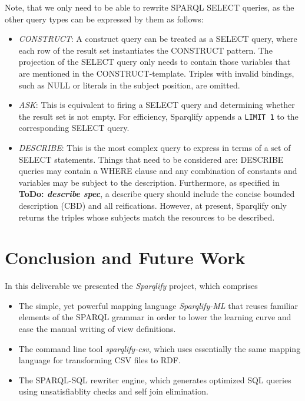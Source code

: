 \documentclass[a4paper,twoside,bibtotoc,abstracton,12pt,BCOR=15mm]{scrreprt}
\newcommand{\todo}[1]{\textbf{ToDo: \textit{#1}}}
\begin{document}
Note, that we only need to be able to rewrite SPARQL SELECT queries, as the other query types can be expressed by  them as follows:

\begin{itemize}
\item \emph{CONSTRUCT}: A construct query can be treated as a SELECT query, where each row of the result set instantiates the CONSTRUCT pattern.
	The projection of the SELECT query only needs to contain those variables that are mentioned in the CONSTRUCT-template.
	Triples with invalid bindings, such as NULL or literals in the subject position, are omitted.
\item \emph{ASK}: This is equivalent to firing a SELECT query and determining whether the result set is not empty. 
	For efficiency, Sparqlify appends a \texttt{LIMIT 1} to the corresponding SELECT query. 
\item \emph{DESCRIBE}: This is the most complex query to express in terms of a set of SELECT statements. 
	Things that need to be considered are: DESCRIBE queries may contain a WHERE clause and any combination of constants and variables may be subject to the description.
	Furthermore, as specified in \todo{describe spec}, a describe query should include the concise bounded description (CBD) and all reifications.
	However, at present, Sparqlify only returns the triples whose subjects match the resources to be described.    
\end{itemize}


\section{Conclusion and Future Work}
In this deliverable we presented the \emph{Sparqlify} project, which comprises
\begin{itemize}
  \item The simple, yet powerful mapping language \emph{Sparqlify-ML} that reuses familiar elements of the SPARQL grammar
  in order to lower the learning curve and ease the manual writing of view definitions.
  \item The command line tool \emph{sparqlify-csv}, which uses essentially the same mapping language for transforming CSV files to RDF. 
  \item The SPARQL-SQL rewriter engine, which generates optimized SQL queries using unsatisfiablity checks and self join elimination.   
\end{itemize}
\end{document}
